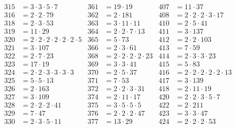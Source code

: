 \begin{align*}
  315&=3\cdot3\cdot5\cdot7                   & 361&=19\cdot19                                   & 407&=11\cdot37                             \\
  316&=2\cdot2\cdot79                        & 362&=2\cdot181                                   & 408&=2\cdot2\cdot2\cdot3\cdot17            \\
  318&=2\cdot3\cdot53                        & 363&=3\cdot11\cdot11                             & 410&=2\cdot5\cdot41                        \\
  319&=11\cdot29                             & 364&=2\cdot2\cdot7\cdot13                        & 411&=3\cdot137                             \\
  320&=2\cdot2\cdot2\cdot2\cdot2\cdot2\cdot5 & 365&=5\cdot73                                    & 412&=2\cdot2\cdot103                       \\
  321&=3\cdot107                             & 366&=2\cdot3\cdot61                              & 413&=7\cdot59                              \\
  322&=2\cdot7\cdot23                        & 368&=2\cdot2\cdot2\cdot2\cdot23                  & 414&=2\cdot3\cdot3\cdot23                  \\
  323&=17\cdot19                             & 369&=3\cdot3\cdot41                              & 415&=5\cdot83                              \\
  324&=2\cdot2\cdot3\cdot3\cdot3\cdot3       & 370&=2\cdot5\cdot37                              & 416&=2\cdot2\cdot2\cdot2\cdot2\cdot13      \\
  325&=5\cdot5\cdot13                        & 371&=7\cdot53                                    & 417&=3\cdot139                             \\
  326&=2\cdot163                             & 372&=2\cdot2\cdot3\cdot31                        & 418&=2\cdot11\cdot19                       \\
  327&=3\cdot109                             & 374&=2\cdot11\cdot17                             & 420&=2\cdot2\cdot3\cdot5\cdot7             \\
  328&=2\cdot2\cdot2\cdot41                  & 375&=3\cdot5\cdot5\cdot5                         & 422&=2\cdot211                             \\
  329&=7\cdot47                              & 376&=2\cdot2\cdot2\cdot47                        & 423&=3\cdot3\cdot47                        \\
  330&=2\cdot3\cdot5\cdot11                  & 377&=13\cdot29                                   & 424&=2\cdot2\cdot2\cdot53                  \\

\end{align*}
